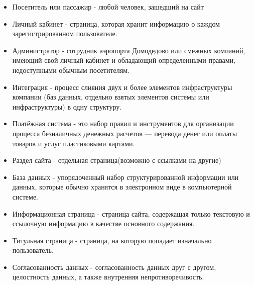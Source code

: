 
\begin{itemize}
    \item Посетитель или пассажир - любой человек, зашедший на сайт
    \item Личный кабинет - страница, которая хранит информацию о каждом зарегистрированном пользователе.
    \item Администратор - сотрудник аэропорта Домодедово или смежных компаний, имеющий свой личный кабинет и обладающий определенными правами,
    недоступными обычным посетителям.
    \item Интеграция - процесс слияния двух и более элементов инфраструктуры компании (баз данных, отдельно взятых элементов системы или инфраструктуры) в одну структуру.
    \item Платёжная система - это набор правил и инструментов для организации процесса безналичных денежных расчетов — перевода денег или оплаты товаров и услуг пластиковыми картами.
    \item Раздел сайта - отдельная страница(возможно с ссылками на другие)
    \item База данных - упорядоченный набор структурированной информации или данных, которые обычно хранятся в электронном виде в компьютерной системе.
    \item Информационная страница - страница сайта, содержащая только текстовую и ссылочную информацию в качестве основного содержания.
    \item Титульная страница - страница, на которую попадает изначально пользователь.
    \item Согласованность данных - согласованность данных друг с другом, целостность данных, а также внутренняя непротиворечивость.
\end{itemize}